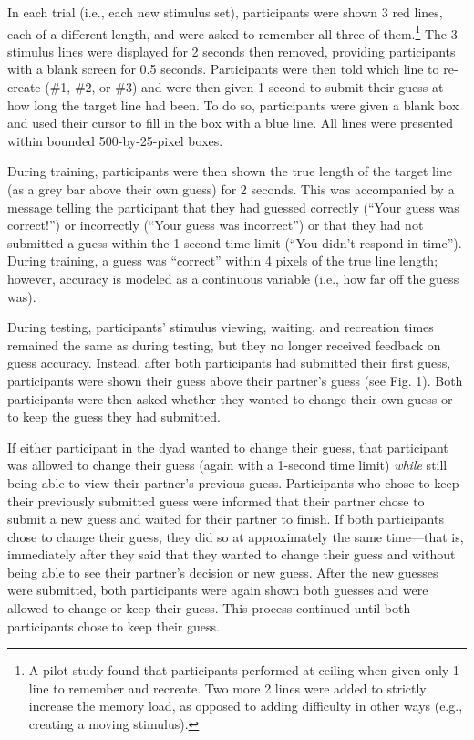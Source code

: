 \documentclass[10pt, letterpaper]{article}
\begin{document}
In each trial (i.e., each new stimulus set), participants were shown 3
red lines, each of a different length, and were asked to remember all
three of
them.\footnote{A pilot study found that participants performed at ceiling when given only 1 line to remember and recreate. Two more 2 lines were added to strictly increase the memory load, as opposed to adding difficulty in other ways (e.g., creating a moving stimulus).}
The 3 stimulus lines were displayed for 2 seconds then removed,
providing participants with a blank screen for 0.5 seconds. Participants
were then told which line to re-create (\#1, \#2, or \#3) and were then
given 1 second to submit their guess at how long the target line had
been. To do so, participants were given a blank box and used their
cursor to fill in the box with a blue line. All lines were presented
within bounded 500-by-25-pixel boxes.

During training, participants were then shown the true length of the
target line (as a grey bar above their own guess) for 2 seconds. This
was accompanied by a message telling the participant that they had
guessed correctly (``Your guess was correct!'') or incorrectly (``Your
guess was incorrect'') or that they had not submitted a guess within the
1-second time limit (``You didn't respond in time''). During training, a
guess was ``correct'' within 4 pixels of the true line length; however,
accuracy is modeled as a continuous variable (i.e., how far off the
guess was).

During testing, participants' stimulus viewing, waiting, and recreation
times remained the same as during testing, but they no longer received
feedback on guess accuracy. Instead, after both participants had
submitted their first guess, participants were shown their guess above
their partner's guess (see Fig. 1). Both participants were then asked
whether they wanted to change their own guess or to keep the guess they
had submitted.

If either participant in the dyad wanted to change their guess, that
participant was allowed to change their guess (again with a 1-second
time limit) \emph{while} still being able to view their partner's
previous guess. Participants who chose to keep their previously
submitted guess were informed that their partner chose to submit a new
guess and waited for their partner to finish. If both participants chose
to change their guess, they did so at approximately the same time---that
is, immediately after they said that they wanted to change their guess
and without being able to see their partner's decision or new guess.
After the new guesses were submitted, both participants were again shown
both guesses and were allowed to change or keep their guess. This
process continued until both participants chose to keep their guess.
\end{document}
